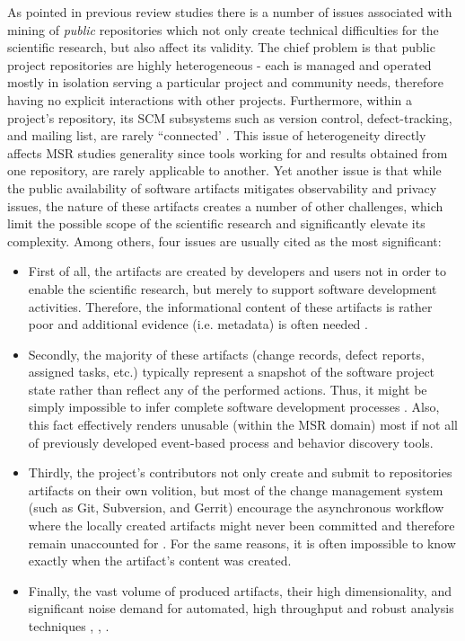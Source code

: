 As pointed in previous review studies \cite{citeulike:12550438} \cite{citeulike:7853299} \cite{citeulike:7465518} there
is a number of issues associated with mining of \textit{public} repositories which not only create technical difficulties for 
the scientific research, but also affect its validity. 
The chief problem is that public project repositories are highly heterogeneous - each is managed and operated 
mostly in isolation serving a particular project and community needs, therefore having no explicit interactions with 
other projects. 
Furthermore, within a project's repository, its SCM subsystems such as version control, defect-tracking, and mailing list, 
are rarely ``connected'  \cite{citeulike:13058334}. 
This issue of heterogeneity directly affects MSR studies generality since tools working for and results obtained from 
one repository, are rarely applicable to another.
Yet another issue is that while the public availability of software artifacts mitigates observability and privacy issues, 
the nature of these artifacts creates a number of other challenges, which limit the possible scope of the scientific 
research and significantly elevate its complexity. Among others, four issues are usually cited as the most significant:
\begin{itemize}
 \item First of all, the artifacts are created by developers and users not in order to enable the scientific research,
but merely to support software development activities. Therefore, the informational content of these artifacts is rather 
poor and additional evidence (i.e. metadata) is often needed \cite{citeulike:342840} \cite{citeulike:7954249} 
\cite{citeulike:7260421}.
 \item Secondly, the majority of these artifacts (change records, defect reports, assigned tasks, etc.) 
typically represent a snapshot of the software project state rather than reflect any of the performed actions.
Thus, it might be simply impossible to infer complete software development processes \cite{citeulike:1296888}.
Also, this fact effectively renders unusable (within the MSR domain) most if not all of previously developed 
event-based process and behavior discovery tools.
 \item Thirdly, the project's contributors not only create and submit to repositories artifacts on their own volition,
but most of the change management system (such as Git, Subversion, and Gerrit) encourage the asynchronous workflow 
where the locally created artifacts might never been committed and therefore remain unaccounted for 
\cite{citeulike:2280690} \cite{citeulike:9037939}. 
For the same reasons, it is often impossible to know exactly when the artifact's content was created.
 \item Finally, the vast volume of produced artifacts, their high dimensionality, and significant noise demand 
 for automated, high throughput and robust analysis techniques 
 \cite{citeulike:12550438}, \cite{citeulike:7853299}, \cite{citeulike:4534888}.
\end{itemize}

